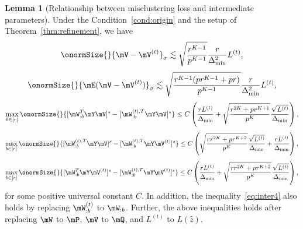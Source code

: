\documentclass[lettersize,onecolumn,journal]{IEEEtran}
\theoremstyle{definition}
\newtheorem{lem}{Lemma}
\theoremstyle{definition}
\newcommand{\of}[1]{\left(#1\right)}
\begin{document}
     \begin{lem}[Relationship between misclustering loss and intermediate parameters]\label{lem:intermediate} Under the Condition~\ref{cond:origin} and the setup of Theorem~\ref{thm:refinement}, we have
    \begin{equation}\label{eq:inter1}
        \onormSize{}{\mV - \mV^{(t)}}_{\sigma} \lesssim \sqrt{\frac{r^{K-1}}{p^{K-1}}}  \frac{r}{\Delta_{\min}^2} L^{(t)},
    \end{equation}
    \begin{equation}\label{eq:inter2}
        \onormSize{}{\mE (\mV - \mV^{(t)})}_{\sigma} \lesssim \sqrt{ \frac{r^{K-1}(p r^{K-1} + p r)}{p^{K-1}}} 
 \frac{r}{\Delta_{\min}^2} L^{(t)},
 \end{equation}
 \begin{equation}\label{eq:inter3}
     \max_{b \in [r]} \onormSize{}{ [ \mW_{:b}^T \mY \mV ]^s   -  [ \mW_{:b}^{(t), T} \mY \mV  ]^s } \leq C \of{\frac{r L^{(t)}}{\Delta_{\min}} + \sqrt{ \frac{r^{2K} + pr^{K+1}}{p^{K}} } \frac{\sqrt{L^{(t)}}}{\Delta_{\min}}},
 \end{equation}
 \begin{equation}\label{eq:inter4}
     \max_{b \in [r]} \onormSize{}{  [  \mW_{:b}^{(t), T}  \mY \mV]^s - [  \mW_{:b}^{(t), T}  \mY \mV^{(t)}]^s } \leq C  \of{ \sqrt{ \frac{rr^{2K} + p r^{K+2}}{p^{K}}}  \frac{\sqrt{L^{(t)}}}{\Delta_{\min}} +  \frac{r L^{(t)}}{\Delta_{\min}}},
     \end{equation}
    \begin{equation}\label{eq:inter5}
         \max_{b \in [r]} \onormSize{}{ [\mW_{:b}^T \mY \mV^{(t)} ]^s   -  [ \mW_{:b}^{(t), T} \mY \mV^{(t)} ]^s } \leq C \of{\frac{rL^{(t)}}{\Delta_{\min}} + \sqrt{ \frac{rr^{2K} + p r^{K+2}}{p^{K}}}  \frac{\sqrt{L^{(t)}}}{\Delta_{\min}}},
    \end{equation}
    for some positive universal constant $C$. In addition, the inequality~\eqref{eq:inter4} also holds by replacing $\mW_{:b}^{(t)}$ to $\mW_{:b}$. Further, the above inequalities holds after replacing $\mW$ to $\mP$, $\mV$ to $\mQ$, and $L^{(t)}$ to $L(\hat z)$.
    \end{lem}
        
\end{document}
